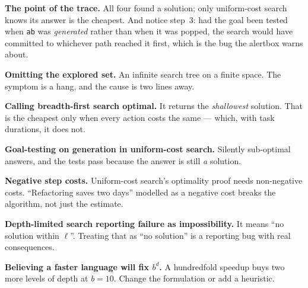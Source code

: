 \begin{worked}
\smallskip
\textbf{The point of the trace.} All four found a solution; only uniform-cost
search knows its answer is the cheapest. And notice step~3: had the goal been
tested when \texttt{ab} was \emph{generated} rather than when it was popped, the
search would have committed to whichever path reached it first, which is the bug
the alertbox warns about.
\end{worked}

\begin{pitfall}
\begin{tight}
  \item \textbf{Omitting the explored set.} An infinite search tree on a finite
        space. The symptom is a hang, and the cause is two lines away.
  \item \textbf{Calling breadth-first search optimal.} It returns the
        \emph{shallowest} solution. That is the cheapest only when every action
        costs the same --- which, with task durations, it does not.
  \item \textbf{Goal-testing on generation in uniform-cost search.} Silently
        sub-optimal answers, and the tests pass because the answer is still
        \emph{a} solution.
  \item \textbf{Negative step costs.} Uniform-cost search's optimality proof needs
        non-negative costs. ``Refactoring saves two days'' modelled as a negative
        cost breaks the algorithm, not just the estimate.
  \item \textbf{Depth-limited search reporting failure as impossibility.} It means
        ``no solution within $\ell$''. Treating that as ``no solution'' is a
        reporting bug with real consequences.
  \item \textbf{Believing a faster language will fix $b^{d}$.} A hundredfold speedup
        buys two more levels of depth at $b=10$. Change the formulation or add a
        heuristic.
\end{tight}
\end{pitfall}

